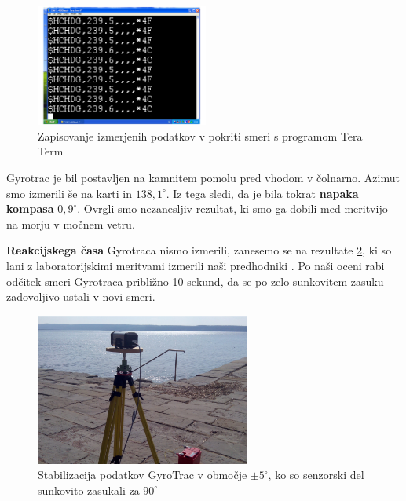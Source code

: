 \begin{figure}
	\centering
	\includegraphics[height=4cm]{Vaje/VzorecPoroc/figs/TT_zapisovanje.pdf}
	\caption{Zapisovanje izmerjenih podatkov v pokriti smeri s programom Tera Term}
	\label{fig:TT_zapisovanjePokriteSmeri}       %
\end{figure}

Gyrotrac je bil postavljen na kamnitem pomolu pred vhodom v čolnarno. Azimut smo izmerili še na karti in $138,1^{\circ}$. Iz tega sledi, da je bila tokrat \textbf{napaka kompasa} $0,9^{\circ}$. Ovrgli smo nezanesljiv rezultat, ki smo ga dobili med meritvijo na morju v močnem vetru. 

\textbf{Reakcijskega časa} Gyrotraca nismo izmerili, zanesemo se na rezultate \ref{fig:StabRez}, ki so lani z laboratorijskimi meritvami izmerili naši predhodniki \cite{Girokompas_2013}. Po naši oceni rabi odčitek smeri Gyrotraca približno 10 sekund, da se po zelo sunkovitem zasuku zadovoljivo ustali v novi smeri.

\begin{figure}
	\centering
	\includegraphics[height=5cm]{Vaje/VzorecPoroc/figs/Gyro_obala}
	\caption{Stabilizacija podatkov GyroTrac v območje $\pm5^{\circ}$, ko so senzorski del sunkovito zasukali za $90^{\circ}$  \cite{Girokompas_2013}}
	\label{fig:StabRez}       %
\end{figure} 


